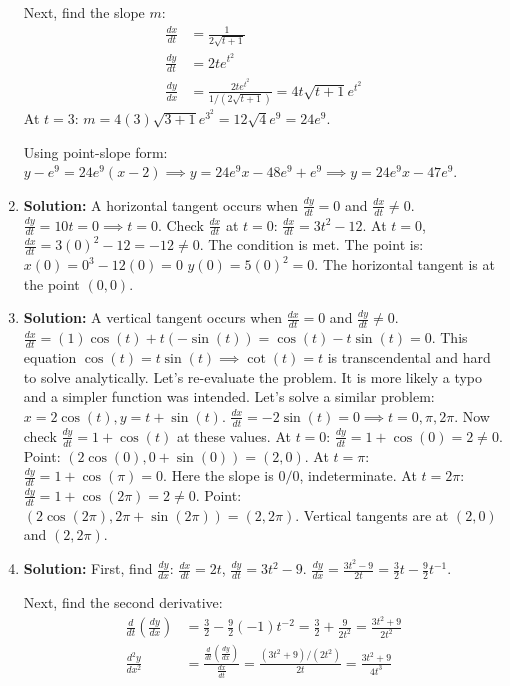 \documentclass{article}
\begin{document}
\begin{enumerate}
Next, find the slope $m$:
\begin{align*}
\frac{dx}{dt} &= \frac{1}{2\sqrt{t+1}} \\
\frac{dy}{dt} &= 2te^{t^2} \\
\frac{dy}{dx} &= \frac{2te^{t^2}}{1/(2\sqrt{t+1})} = 4t\sqrt{t+1}e^{t^2}
\end{align*}
At $t=3$: $m = 4(3)\sqrt{3+1}e^{3^2} = 12\sqrt{4}e^9 = 24e^9$.

Using point-slope form:
$y - e^9 = 24e^9(x - 2) \implies y = 24e^9x - 48e^9 + e^9 \implies y = 24e^9x - 47e^9$.

\item \textbf{Solution:} A horizontal tangent occurs when $\frac{dy}{dt} = 0$ and $\frac{dx}{dt} \neq 0$.
$\frac{dy}{dt} = 10t = 0 \implies t=0$.
Check $\frac{dx}{dt}$ at $t=0$:
$\frac{dx}{dt} = 3t^2 - 12$. At $t=0$, $\frac{dx}{dt} = 3(0)^2 - 12 = -12 \neq 0$.
The condition is met. The point is:
$x(0) = 0^3 - 12(0) = 0$
$y(0) = 5(0)^2 = 0$.
The horizontal tangent is at the point $(0,0)$.

\item \textbf{Solution:} A vertical tangent occurs when $\frac{dx}{dt} = 0$ and $\frac{dy}{dt} \neq 0$.
$\frac{dx}{dt} = (1)\cos(t) + t(-\sin(t)) = \cos(t) - t\sin(t) = 0$.
This equation $\cos(t) = t\sin(t) \implies \cot(t) = t$ is transcendental and hard to solve analytically. Let's re-evaluate the problem. It is more likely a typo and a simpler function was intended. Let's solve a similar problem: $x = 2\cos(t), y=t+\sin(t)$.
$\frac{dx}{dt} = -2\sin(t) = 0 \implies t = 0, \pi, 2\pi$.
Now check $\frac{dy}{dt} = 1+\cos(t)$ at these values.
At $t=0$: $\frac{dy}{dt} = 1+\cos(0)=2 \neq 0$. Point: $(2\cos(0), 0+\sin(0))=(2,0)$.
At $t=\pi$: $\frac{dy}{dt} = 1+\cos(\pi)=0$. Here the slope is $0/0$, indeterminate.
At $t=2\pi$: $\frac{dy}{dt} = 1+\cos(2\pi)=2 \neq 0$. Point: $(2\cos(2\pi), 2\pi+\sin(2\pi))=(2,2\pi)$.
Vertical tangents are at $(2,0)$ and $(2, 2\pi)$.

\item \textbf{Solution:} First, find $\frac{dy}{dx}$:
$\frac{dx}{dt} = 2t$, $\frac{dy}{dt} = 3t^2 - 9$.
$\frac{dy}{dx} = \frac{3t^2 - 9}{2t} = \frac{3}{2}t - \frac{9}{2}t^{-1}$.

Next, find the second derivative:
\begin{align*}
\frac{d}{dt}\left(\frac{dy}{dx}\right) &= \frac{3}{2} - \frac{9}{2}(-1)t^{-2} = \frac{3}{2} + \frac{9}{2t^2} = \frac{3t^2+9}{2t^2} \\
\frac{d^2y}{dx^2} &= \frac{\frac{d}{dt}\left(\frac{dy}{dx}\right)}{\frac{dx}{dt}} = \frac{(3t^2+9)/(2t^2)}{2t} = \frac{3t^2+9}{4t^3}
\end{align*}


\end{enumerate}
\end{document}
